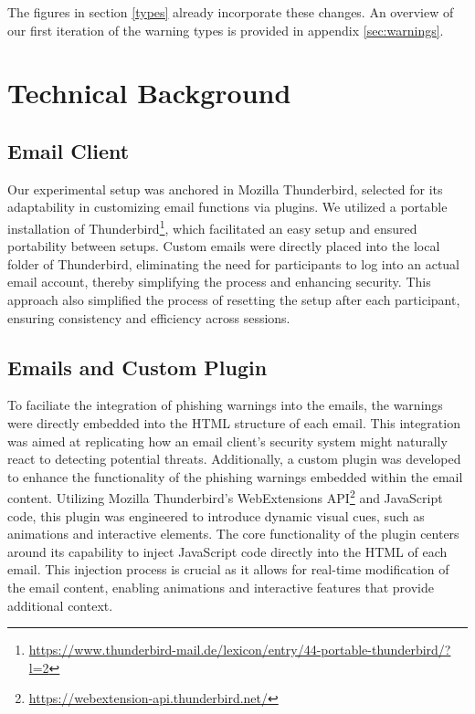 \documentclass[
  a4paper,  %
  twoside,  %
  bibliography=totoc,
  headsepline,
  cleardoublepage=empty,
  parskip=half,
  draft=false
]{scrbook}
\begin{document}
The figures in section \ref{types} already incorporate these changes. An overview of our first iteration of the warning types is provided in appendix \ref{sec:warnings}.

\section{Technical Background}
\subsection{Email Client}
Our experimental setup was anchored in Mozilla Thunderbird, selected for its adaptability in customizing email functions via plugins. We utilized a portable installation of Thunderbird\footnote{\href{https://www.thunderbird-mail.de/lexicon/entry/44-portable-thunderbird/?l=2}{https://www.thunderbird-mail.de/lexicon/entry/44-portable-thunderbird/?l=2}}, which facilitated an easy setup and ensured portability between setups. Custom emails were directly placed into the local folder of Thunderbird, eliminating the need for participants to log into an actual email account, thereby simplifying the process and enhancing security. This approach also simplified the process of resetting the setup after each participant, ensuring consistency and efficiency across sessions.

\subsection{Emails and Custom Plugin}
To faciliate the integration of phishing warnings into the emails, the warnings were directly embedded into the HTML structure of each email. This integration was aimed at replicating how an email client's security system might naturally react to detecting potential threats.\newline
Additionally, a custom plugin was developed to enhance the functionality of the phishing warnings embedded within the email content. Utilizing Mozilla Thunderbird's WebExtensions API\footnote{ \href{https://webextension-api.thunderbird.net/}{https://webextension-api.thunderbird.net/}} and JavaScript code, this plugin was engineered to introduce dynamic visual cues, such as animations and interactive elements.
The core functionality of the plugin centers around its capability to inject JavaScript code directly into the HTML of each email. This injection process is crucial as it allows for real-time modification of the email content, enabling animations and interactive features that provide additional context.
\end{document}
